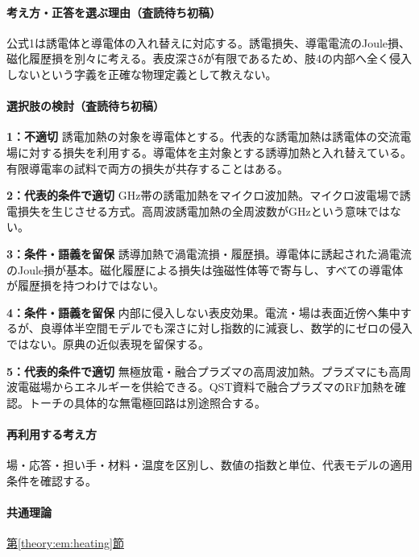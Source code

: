 \paragraph{考え方・正答を選ぶ理由（査読待ち初稿）} 公式1は誘電体と導電体の入れ替えに対応する。誘電損失、導電電流のJoule損、磁化履歴損を別々に考える。表皮深さδが有限であるため、肢4の内部へ全く侵入しないという字義を正確な物理定義として教えない。

\paragraph{選択肢の検討（査読待ち初稿）}\mbox{}\par

\noindent\textbf{1：不適切} 誘電加熱の対象を導電体とする。代表的な誘電加熱は誘電体の交流電場に対する損失を利用する。導電体を主対象とする誘導加熱と入れ替えている。有限導電率の試料で両方の損失が共存することはある。\par

\noindent\textbf{2：代表的条件で適切} GHz帯の誘電加熱をマイクロ波加熱。マイクロ波電場で誘電損失を生じさせる方式。高周波誘電加熱の全周波数がGHzという意味ではない。\par

\noindent\textbf{3：条件・語義を留保} 誘導加熱で渦電流損・履歴損。導電体に誘起された渦電流のJoule損が基本。磁化履歴による損失は強磁性体等で寄与し、すべての導電体が履歴損を持つわけではない。\par

\noindent\textbf{4：条件・語義を留保} 内部に侵入しない表皮効果。電流・場は表面近傍へ集中するが、良導体半空間モデルでも深さに対し指数的に減衰し、数学的にゼロの侵入ではない。原典の近似表現を留保する。\par

\noindent\textbf{5：代表的条件で適切} 無極放電・融合プラズマの高周波加熱。プラズマにも高周波電磁場からエネルギーを供給できる。QST資料で融合プラズマのRF加熱を確認。トーチの具体的な無電極回路は別途照合する。\par

\paragraph{再利用する考え方} 場・応答・担い手・材料・温度を区別し、数値の指数と単位、代表モデルの適用条件を確認する。

\paragraph{共通理論} \hyperref[theory:em:heating]{第\ref*{theory:em:heating}節}

